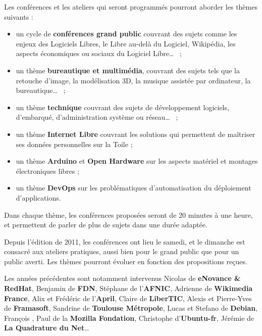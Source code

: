 \documentclass{cdl_sponsor}
\begin{document}
Les conférences et les ateliers qui seront programmés pourront aborder les thèmes suivants :
\begin{itemize}
\item[\logo] un cycle de \textbf{conférences grand public} couvrant des sujets comme les enjeux des Logiciels Libres, le Libre au-delà du Logiciel, Wikipédia, les aspects économiques ou sociaux du Logiciel Libre\dots ~ ;
\item[\logo] un thème \textbf{bureautique et multimédia}, couvrant des sujets tels que la retouche d'image, la modélisation 3D, la musique assistée par ordinateur, la bureautique\dots ~ ;
\item[\logo] un thème \textbf{technique} couvrant des sujets de développement logiciels, d'embarqué, d'administration système ou réseau\dots ~ ;
\item[\logo] un thème \textbf{Internet Libre} couvrant les solutions qui permettent de maîtriser ses données personnelles sur la Toile ;
\item[\logo] un thème \textbf{Arduino} et \textbf{Open Hardware} sur les aspects matériel et montages électroniques libres ;
\item[\logo] un thème \textbf{DevOps} sur les problématiques d'automatisation du déploiement d'applications.
\end{itemize}

\Separateur

Dans chaque thème, les conférences proposées seront de 20 minutes à une heure, et permettent de parler de plus de sujets dans une durée adaptée.

\Separateur

Depuis l'édition de 2011, les conférences ont lieu le samedi, et le dimanche est consacré aux ateliers pratiques, aussi bien pour le grand public que pour un public averti. Les thèmes pourront évoluer en fonction des propositions reçues.

\Separateur

Les années précédentes sont notamment intervenus Nicolas  de \textbf{eNovance \& RedHat}, Benjamin  de \textbf{FDN}, Stéphane  de l'\textbf{AFNIC}, Adrienne  de \textbf{Wikimedia France}, Alix  et Frédéric  de l'\textbf{April}, Claire  de \textbf{LiberTIC}, Alexis  et Pierre-Yves  de \textbf{Framasoft}, Sandrine  de \textbf{Toulouse Métropole}, Lucas  et Stefano  de \textbf{Debian}, François , Paul  de la \textbf{Mozilla Fondation}, Christophe  d'\textbf{Ubuntu-fr}, Jérémie  de \textbf{La Quadrature du Net}\dots
\end{document}
